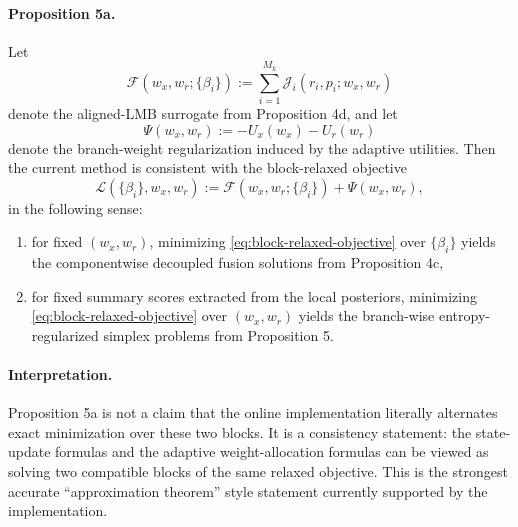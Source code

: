 \paragraph{Proposition 5a.}
Let
\begin{equation}
\mathcal{F}(w_x,w_r;\{\beta_i\})
:=
\sum_{i=1}^{M_k}\mathcal{J}_i(r_i,p_i;w_x,w_r)
\end{equation}
denote the aligned-LMB surrogate from Proposition 4d, and let
\begin{equation}
\Psi(w_x,w_r)
:=
-U_x(w_x)-U_r(w_r)
\end{equation}
denote the branch-weight regularization induced by the adaptive utilities. Then the current method is consistent with the block-relaxed objective
\begin{equation}
\mathcal{L}(\{\beta_i\},w_x,w_r)
:=
\mathcal{F}(w_x,w_r;\{\beta_i\}) + \Psi(w_x,w_r),
\label{eq:block-relaxed-objective}
\end{equation}
in the following sense:
\begin{enumerate}
\item for fixed $(w_x,w_r)$, minimizing \eqref{eq:block-relaxed-objective} over $\{\beta_i\}$ yields the componentwise decoupled fusion solutions from Proposition 4c,
\item for fixed summary scores extracted from the local posteriors, minimizing \eqref{eq:block-relaxed-objective} over $(w_x,w_r)$ yields the branch-wise entropy-regularized simplex problems from Proposition 5.
\end{enumerate}

\paragraph{Interpretation.}
Proposition 5a is not a claim that the online implementation literally alternates exact minimization over these two blocks. It is a consistency statement: the state-update formulas and the adaptive weight-allocation formulas can be viewed as solving two compatible blocks of the same relaxed objective. This is the strongest accurate ``approximation theorem'' style statement currently supported by the implementation.

